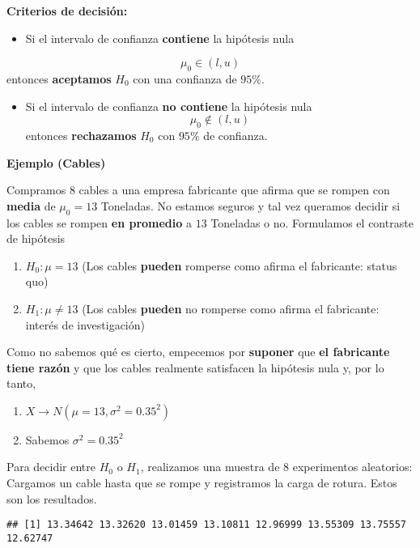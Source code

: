 \documentclass[
]{book}
\providecommand{\tightlist}{%
  \setlength{\itemsep}{0pt}\setlength{\parskip}{0pt}}
\begin{document}
\textbf{Criterios de decisión:}

\begin{itemize}
\tightlist
\item
  Si el intervalo de confianza \textbf{contiene} la hipótesis nula
\end{itemize}

\[\mu_0\in (l,u)\] entonces \textbf{aceptamos} \(H_0\) con una confianza de \(95\%\).

\begin{itemize}
\tightlist
\item
  Si el intervalo de confianza \textbf{no contiene} la hipótesis nula\[\mu_0\notin (l,u)\] entonces \textbf{rechazamos} \(H_0\) con \(95\%\) de confianza.
\end{itemize}

\textbf{Ejemplo (Cables)}

Compramos \(8\) cables a una empresa fabricante que afirma que se rompen con \textbf{media} de \(\mu_0=13\) Toneladas. No estamos seguros y tal vez queramos decidir si los cables se rompen \textbf{en promedio} a \(13\) Toneladas o no. Formulamos el contraste de hipótesis

\begin{enumerate}
\def\labelenumi{\alph{enumi}.}
\tightlist
\item
  \(H_0:\mu = 13\) (Los cables \textbf{pueden} romperse como afirma el fabricante: status quo)
\item
  \(H_1:\mu \neq 13\) (Los cables \textbf{pueden} no romperse como afirma el fabricante: interés de investigación)
\end{enumerate}

Como no sabemos qué es cierto, empecemos por \textbf{suponer} que \textbf{el fabricante tiene razón} y que los cables realmente satisfacen la hipótesis nula y, por lo tanto,

\begin{enumerate}
\def\labelenumi{\arabic{enumi}.}
\tightlist
\item
  \(X \rightarrow N(\mu=13, \sigma^2=0.35^2)\)
\item
  Sabemos \(\sigma^2=0.35^2\)
\end{enumerate}

Para decidir entre \(H_0\) o \(H_1\), realizamos una muestra de \(8\) experimentos aleatorios: Cargamos un cable hasta que se rompe y registramos la carga de rotura. Estos son los resultados.

\begin{verbatim}
## [1] 13.34642 13.32620 13.01459 13.10811 12.96999 13.55309 13.75557 12.62747
\end{verbatim}
\end{document}
